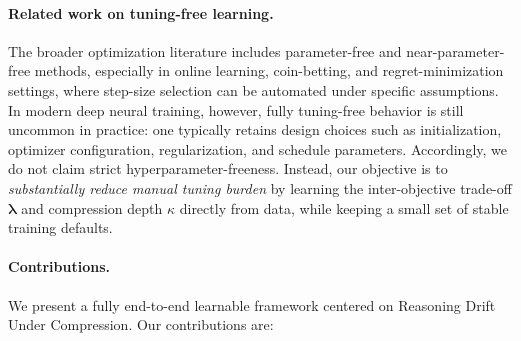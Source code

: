 \documentclass[lettersize,journal]{IEEEtran}
\newcommand{\lambdavec}{\boldsymbol{\lambda}}
\begin{document}
\paragraph*{Related work on tuning-free learning.}
The broader optimization literature includes parameter-free and
near-parameter-free methods, especially in online learning,
coin-betting, and regret-minimization settings, where step-size
selection can be automated under specific assumptions.
In modern deep neural training, however, fully tuning-free behavior
is still uncommon in practice: one typically retains design choices
such as initialization, optimizer configuration, regularization,
and schedule parameters.
Accordingly, we do not claim strict hyperparameter-freeness.
Instead, our objective is to \emph{substantially reduce manual
tuning burden} by learning the inter-objective trade-off
$\lambdavec$ and compression depth $\kappa$ directly from data,
while keeping a small set of stable training defaults.

\paragraph*{Contributions.}
We present a fully end-to-end learnable framework centered on
Reasoning Drift Under Compression.
Our contributions are:
\end{document}

